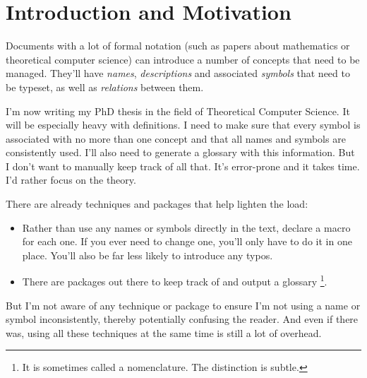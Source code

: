 \documentclass[a4paper]{packagedoc}
\begin{document}

\maketitle

\section{Introduction and Motivation}                                          %

Documents with a lot of formal notation (such as papers about mathematics or
theoretical computer science) can introduce a number of concepts that need
to be managed. They'll have \emph{names}, \emph{descriptions} and associated
\emph{symbols} that need to be typeset, as well as \emph{relations} between them.

I'm now writing my PhD thesis in the field of Theoretical Computer Science.
It will be especially heavy with definitions. I need to make sure that every
symbol is associated with no more than one concept and that all names and
symbols are consistently used. I'll also need to generate a glossary with
this information. But I don't want to manually keep track
of all that. It's error-prone and it takes time. I'd rather focus on the theory.

There are already techniques and packages that help lighten the load:
%
\begin{itemize}
  \item Rather than use any names or symbols directly in the text, declare
        a macro for each one. If you ever need to change one, you'll only
        have to do it in one place. You'll also be far less likely to
        introduce any typos.
  \item There are packages out there to keep track of and output a glossary%
        \footnote{It is sometimes called a nomenclature.
                  The distinction is subtle.}.
\end{itemize}

But I'm not aware of any technique or package to ensure I'm not
using a name or symbol inconsistently, thereby potentially
confusing the reader. And even if there was, using all these techniques at the
same time is still a lot of overhead.
\end{document}
